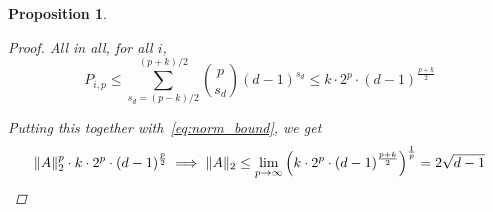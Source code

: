 \documentclass{amsart}
\theoremstyle{plain}
\newtheorem*{proposition}{\textbf{Proposition}}
\theoremstyle{definition}
\DeclarePairedDelimiter{\norm}{\lVert}{\rVert}
\begin{document}
\begin{proposition}
\begin{proof}
            All in all, for all $i$,
            \begin{equation*}
                P_{i,p}
                \leq
                \sum_{s_d = (p-k)/2}^{(p+k)/2} \binom{p}{s_d} (d-1)^{s_d}
                \leq
                k \cdot 2^p \cdot (d-1)^{\frac{p+k}{2}}
            \end{equation*}

            Putting this together with~\eqref{eq:norm_bound}, we get
            \begin{equation*}
                \norm{A}_2^p \cdot k \cdot 2^p \cdot (d-1)^{\frac{p}{2}} \implies
                \norm{A}_2 \leq \lim_{p \to \infty}
                \left(k \cdot 2^p \cdot (d-1)^{\frac{p+k}{2}}\right)^{\frac{1}{p}} = 2 \sqrt{d-1}
            \end{equation*}
        \end{proof}
    \end{proposition}
\end{document}
